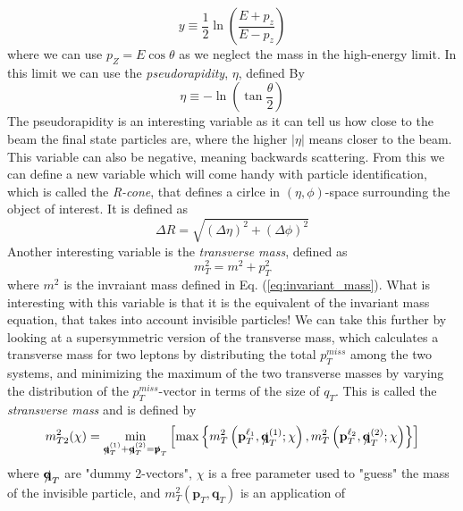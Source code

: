 \documentclass[14pt, a4paper]{book}
\begin{document}
\begin{equation}\label{eq:rapidity}
    y \equiv \frac{1}{2}\ln\left(\frac{E+p_z}{E-p_z}\right)  
\end{equation} 
where we can use $p_Z = E\cos\theta$ as we neglect the mass in the high-energy limit. In this limit we can use the \textit{pseudorapidity}, $\eta$, defined By
\begin{equation}\label{eq:pseudorapidity}
    \eta \equiv -\ln\left(\tan\frac{\theta}{2}\right)
\end{equation}
The pseudorapidity is an interesting variable as it can tell us how close to the beam the final state particles are, where the higher $\vert\eta\vert$ means closer to the beam. This variable can also be negative, meaning backwards scattering. 
From this we can define a new variable which will come handy with particle identification, which is called the \textit{R-cone}, that defines a cirlce in $(\eta,\phi)$-space surrounding the object of interest. It is defined as
\begin{equation}\label{eq:R-cone}
    \Delta R = \sqrt{(\Delta\eta)^2+(\Delta\phi)^2}
\end{equation}
Another interesting variable is the \textit{transverse mass}, defined as
\begin{equation}\label{eq:transverse_mass}
    m_T^2 = m^2 + p_T^2
\end{equation}
where $m^2$ is the invraiant mass defined in Eq. (\ref{eq:invariant_mass}). What is interesting with this variable is that it is the equivalent of the invariant mass equation, that takes into account invisible particles! 
We can take this further by looking at a supersymmetric version of the transverse mass, which calculates a transverse mass for two leptons by distributing the total $p_T^{miss}$ among the two systems, 
and minimizing the maximum of the two transverse masses by varying the distribution of the $p_T^{miss}$-vector in terms of the size of $q_T$. This is called the \textit{stransverse mass} and is defined by
\begin{equation}
    m_{T2}^2(\chi) = \underset{\slashed{\mathbf{q}}^{(1)}_T + \slashed{\mathbf{q}}^{(2)}_T = \slashed{\mathbf{p}}_T}{\min}
    \left[\max \left\{m_T^2\left(\mathbf{p}_T^{\ell_1}, \slashed{\mathbf{q}}^{(1)}_T;\chi\right), m_T^2\left(\mathbf{p}_T^{\ell_2}, \slashed{\mathbf{q}}^{(2)}_T;\chi\right) 
    \right\}\right] 
\end{equation}
where $\slashed{\mathbf{q}}_T$ are "dummy 2-vectors", $\chi$ is a free parameter used to "guess" the mass of the invisible particle, and $m_T^2\left(\mathbf{p}_T, \mathbf{q}_T\right)$ is an application of 
\end{document}
